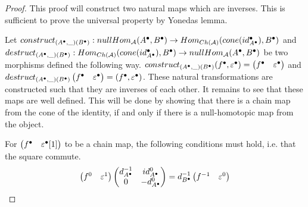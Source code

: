     \begin{proof}
        This proof will construct two natural maps which are inverses. This is sufficient to prove the universal property by Yonedas lemma.

        Let $construct_{(A^{\bullet},\_)(B^{\bullet})}:nullHom_{\mathcal{A}}(A^{\bullet},B^{\bullet})\rightarrow Hom_{Ch(\mathcal{A})}(cone(id_{A^{\bullet}}^{\bullet}),B^{\bullet})$ and \\$destruct_{(A^{\bullet},\_)(B^{\bullet})}:Hom_{Ch(\mathcal{A})}(cone(id_{A^{\bullet}}^{\bullet}),B^{\bullet})\rightarrow nullHom_{\mathcal{A}}(A^{\bullet},B^{\bullet})$ be two morphisms defined the following way.
        $construct_{(A^{\bullet},\_)(B^{\bullet})}(f^{\bullet},\varepsilon^{\bullet})=\begin{pmatrix}f^{\bullet} & \varepsilon^{\bullet}\end{pmatrix}$ and \\$destruct_{(A^{\bullet},\_)(B^{\bullet})}\begin{pmatrix}f^{\bullet} & \varepsilon^{\bullet}\end{pmatrix} = (f^{\bullet}, \varepsilon^{\bullet})$. These natural transformations are constructed such that they are inverses of each other. It remains to see that these maps are well defined. This will be done by showing that there is a chain map from the cone of the identity, if and only if there is a null-homotopic map from the object.

        \begin{center}
        \end{center}

        For $\begin{pmatrix}f^{\bullet} & \varepsilon^{\bullet}[1]\end{pmatrix}$ to be a chain map, the following conditions must hold, i.e. that the square commute.
        \begin{equation*}
            \begin{pmatrix}f^0 & \varepsilon^1 \end{pmatrix}\begin{pmatrix}d^{-1}_{A^{\bullet}} & id^0_{A^{\bullet}} \\ 0 & -d^0_{A^{\bullet}}\end{pmatrix}=d^{-1}_{B^{\bullet}}\begin{pmatrix} f^{-1} & \varepsilon^0 \end{pmatrix}
        \end{equation*}


\end{proof}
